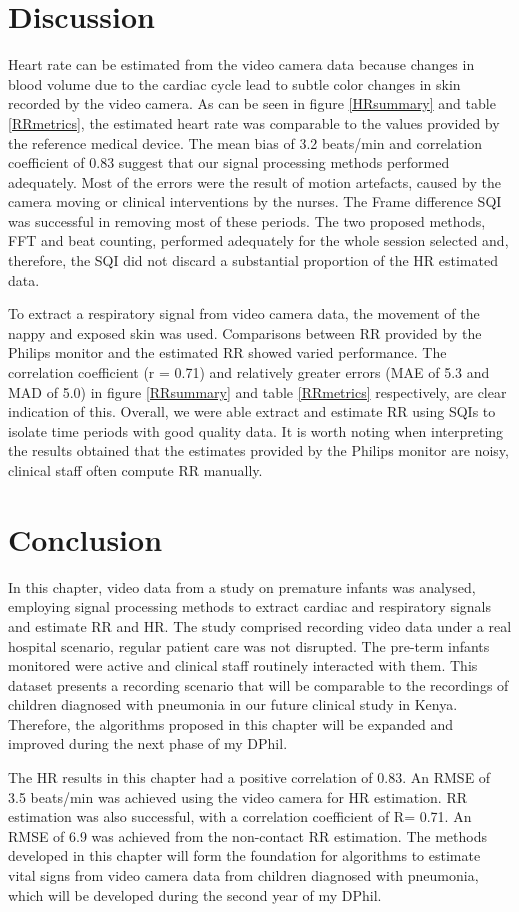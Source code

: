 \section{Discussion}

Heart rate can be estimated from the video camera data because changes in blood volume due to the cardiac cycle lead to subtle color changes in skin recorded by the video camera. As can be seen in figure \ref{HRsummary} and table \ref{RRmetrics}, the estimated heart rate was comparable to the values provided by the reference medical device. The mean bias of 3.2 beats/min and correlation coefficient of 0.83 suggest that our signal processing methods performed adequately. Most of the errors were the result of motion artefacts, caused by the camera moving or clinical interventions by the nurses. The Frame difference SQI was successful in removing most of these periods. The two proposed methods, FFT and beat counting, performed adequately for the whole session selected and, therefore, the SQI did not discard a substantial proportion of the HR estimated data.

To extract a respiratory signal from video camera data, the movement of the nappy and exposed skin was used. Comparisons between RR provided by the Philips monitor and the estimated RR showed varied performance. The correlation coefficient (r = 0.71) and relatively greater errors (MAE of 5.3 and MAD of 5.0) in figure \ref{RRsummary} and table \ref{RRmetrics} respectively, are clear indication of this. Overall, we were able extract and estimate RR using SQIs to isolate time periods with good quality data. It is worth noting when interpreting the results obtained that the estimates provided by the Philips monitor are noisy, clinical staff often compute RR manually.

\section{Conclusion}

In this chapter, video data from a study on premature infants was analysed, employing signal processing methods to extract cardiac and respiratory signals and estimate RR and HR. The study comprised recording video data under a real hospital scenario, regular patient care was not disrupted. The pre-term infants monitored were active and clinical staff routinely interacted with them. This dataset presents a recording scenario that will be comparable to the recordings of children diagnosed with pneumonia in our future clinical study in Kenya. Therefore, the algorithms proposed in this chapter will be expanded and improved during the next phase of my DPhil.

The HR results in this chapter had a positive correlation of 0.83. An RMSE of 3.5 beats/min was achieved using the video camera for HR estimation. RR estimation was also successful, with a correlation coefficient of R= 0.71. An RMSE of 6.9 was achieved from the non-contact RR estimation. The methods developed in this chapter will form the foundation for algorithms to estimate vital signs from video camera data from children diagnosed with pneumonia, which will be developed during the second year of my DPhil.